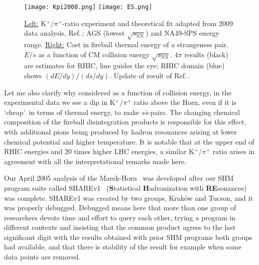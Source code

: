 \documentclass{appolb}
\begin{document}
\begin{figure}[bht]
\centerline{%
\texttt{[image: Kpi2008.png]} 
\texttt{[image: ES.png]}}
\caption{\underline{Left:} K$^+/\pi^+$-ratio experiment and theoretical fit adapted from 2009 data analysis, Ref.\,\cite{Rafelski:2009gu}; AGS (lowest $\sqrt{s_\mathrm{NN}}$) and NA49-SPS energy range. \underline{Right:} Cost in fireball thermal energy of a strangeness pair, $E/s$ as a function of CM collision energy $\sqrt{s_\mathrm{NN}}$. $4\pi$ results (black) are estimates for RHIC, line guides the eye; RHIC domain (blue) shows $(dE/dy)/(ds/dy)$. Update of result of Ref.\,\cite{Letessier:2005qe}.}
\label{Kpi2008Fig}
\end{figure}

Let me also clarify why considered as a function of collision energy, in the experimental data we see a dip in K$^+/\pi^+$ ratio above the Horn, even if it is \lq cheap\rq\ in terms of thermal energy, to make $s\bar s$-pairs. The changing chemical composition of the fireball disintegration products is responsible for this effect, with additional pions being produced by hadron resonances arising at lower chemical potential and higher temperature. It is notable  that at the upper end of RHIC energies and 20 times higher LHC energies, a similar K$^+/\pi^+$ ratio arises in agreement with all the interpretational remarks made here. 


Our April 2005 analysis of the Marek-Horn~\cite{Letessier:2005qe} was developed after our SHM program suite called SHAREv1~\cite{Torrieri:2004zz} ({\bf S}tatistical {\bf H}adronization with {\bf RE}sonances)  was complete. SHAREv1 was created by two groups, Krak\'ow and Tucson, and it was properly debugged. Debugged means here that more than one group of researchers devote time and effort to query each other, trying a program in different contexts and insisting that the common product agrees to the last significant digit with the results obtained with prior SHM programs both groups had available, and that there is stability of the result for example when some data points are removed. 
 
\end{document}
